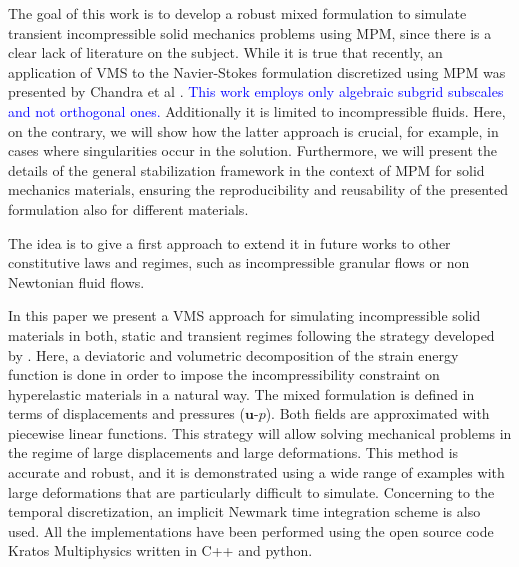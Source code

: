 \documentclass[11pt,english]{article}
\newcommand{\LM}[1]{\textcolor{blue}{#1}}
\begin{document}
The goal of this work is to develop a robust mixed formulation to simulate  transient incompressible solid mechanics problems using  MPM, since there is a clear lack of literature on the subject.  While it is true that recently, an application of VMS to the Navier-Stokes formulation discretized using MPM was presented by Chandra et al \cite{chandra2024stabilized}. \LM{This work employs only algebraic subgrid subscales and not orthogonal ones.} Additionally it is limited to incompressible fluids. Here, on the contrary, we will show how the latter approach is crucial, for example, in cases where singularities occur in the solution. Furthermore, we will present the details of the general stabilization framework in the context of MPM  for solid mechanics materials, ensuring the reproducibility and reusability of the presented formulation also for different materials. 
 

The idea is to give a first approach to extend it in future works to other constitutive laws and regimes, such as incompressible granular flows or non Newtonian fluid flows. 


In this paper we present a VMS approach for simulating incompressible solid materials in both, static and transient regimes following the strategy developed by \cite{castanar2020stabilized}. Here, a deviatoric and volumetric decomposition of the strain energy function is done in order to impose the incompressibility constraint on hyperelastic materials in a natural way.  The mixed formulation is defined in terms of displacements and pressures ($\boldsymbol{u}$-$p$). Both fields are approximated with piecewise linear functions.  This strategy will allow solving mechanical problems in the regime of large displacements and large deformations. This method is accurate and robust, and it is demonstrated using a wide range of examples with large deformations that are particularly difficult to simulate. Concerning to the temporal discretization, an implicit Newmark time integration scheme is also used. All the implementations have been performed using the open source code Kratos Multiphysics \cite{kratos1} written in C++ and python.
\end{document}
